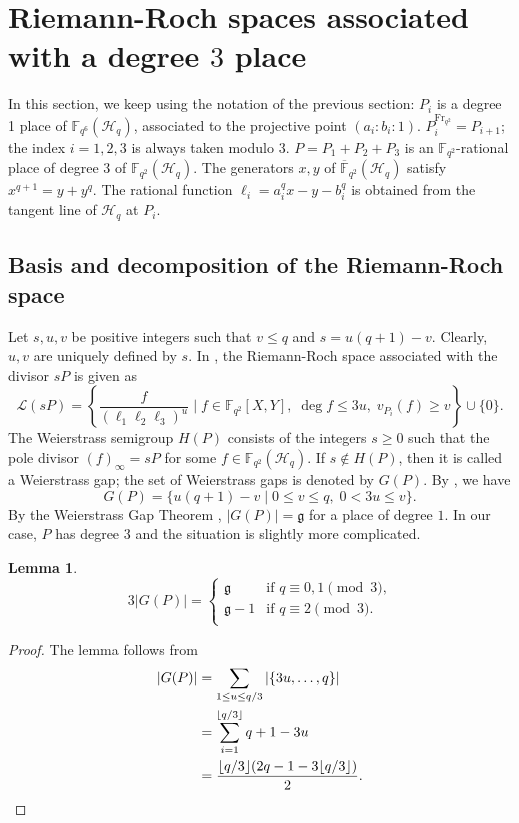 \documentclass[11pt]{amsart}
\theoremstyle{plain}
\newtheorem{lemma}[theorem]{Lemma}
\theoremstyle{definition}
\theoremstyle{remark}
\newcommand{\Frob}{{\mathrm{Fr}_{q^2}}}
\newcommand{\g}{\mathfrak{g}}
\begin{document}
\section{Riemann-Roch spaces associated with a degree $3$ place} \label{sec:riemann-roch}
In this section, we keep using the notation of the previous section: $P_i$ is a degree 1 place of $\mathbb{F}_{q^6}(\mathscr{H}_q)$, associated to the projective point $(a_i:b_i:1)$. $P_i^\Frob=P_{i+1}$; the index $i=1,2,3$ is always taken modulo $3$. $P=P_1+P_2+P_3$ is an $\mathbb{F}_{q^2}$-rational place of degree $3$ of $\mathbb{F}_{q^2}(\mathscr{H}_q)$. The generators $x,y$ of $\overline{\mathbb{F}}_{q^2}(\mathscr{H}_q)$ satisfy $x^{q+1}=y+y^q$. The rational function $\ell_i=a_i^qx-y-b_i^q$ is obtained from the tangent line of $\mathscr{H}_q$ at $P_i$. 

\subsection{Basis and decomposition of the Riemann-Roch space}
Let $s,u,v$ be positive integers such that $v\leq q$ and $s=u(q+1)-v$. Clearly, $u,v$ are uniquely defined by $s$. In \cite{korchmaros2013hermitian}, the Riemann-Roch space associated with the divisor $sP$ is given as
\[\mathscr{L}(sP) = \left\{ \frac{f}{(\ell_1\ell_2\ell_3)^u} \mid f \in \mathbb{F}_{q^2}[X,Y], \; \deg f \leq 3u, \; v_{P_i}(f) \geq v \right\} \cup \{0\}.\]
The Weierstrass semigroup \cite{beelen2023weierstrass} $H(P)$ consists of the integers $s\geq 0$ such that the pole divisor $(f)_\infty=sP$ for some $f\in {\mathbb{F}_{q^2}}(\mathscr{H}_q)$. If $s\not\in H(P)$, then it is called a Weierstrass gap; the set of Weierstrass gaps is denoted by $G(P)$. By \cite[Theorem 3.1]{korchmaros2013hermitian}, we have
\[G(P) = \{u(q+1)-v \mid 0\leq v\leq q, \; 0<3u\leq v\}.\]
By the Weierstrass Gap Theorem \cite[Theorem 1.6.8]{stichtenoth2009algebraic}, $|G(P)|=\g$ for a place of degree $1$. In our case, $P$ has degree $3$ and the situation is slightly more complicated.

\begin{lemma} \label{lm:GP-size}
\[3|G(P)| = \begin{cases}
\g & \text{if $q\equiv 0,1 \pmod3$,} \\
\g-1 & \text{if $q\equiv 2 \pmod3$.} \\
\end{cases}\]
\end{lemma}
\begin{proof}
The lemma follows from
\begin{align*}
|G(P)| &= \sum_{1 \leq u \leq q/3} |\{3u,\ldots,q\}| \\
&= \sum_{i=1}^{\lfloor q/3 \rfloor} q+1-3u \\
&= \frac{\lfloor q/3 \rfloor(2q-1-3\lfloor q/3 \rfloor)}{2}. \qedhere
\end{align*}
\end{proof}
\end{document}
